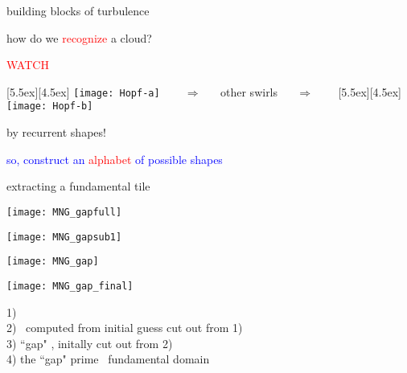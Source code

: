 \begin{frame}{building blocks of turbulence}

how do we \textcolor{red}{recognize} a cloud?

\bigskip
\begin{center}
\centerline{\textcolor{red}{\Huge WATCH}}

\begin{minipage}[t]{\textwidth}
	\begin{center}
\centerline{
\raisebox{-4.0ex}[5.5ex][4.5ex]
		 {\texttt{[image: Hopf-a]}}
~~~ $\Longrightarrow$ ~~ {other swirls} ~~ $\Longrightarrow$ ~~~
	\raisebox{-4.0ex}[5.5ex][4.5ex]
		 {\texttt{[image: Hopf-b]}}
          }
	\end{center}
\end{minipage}
\end{center}

\bigskip

{\Large by recurrent shapes!}

\vfill

\centerline{
\textcolor{blue}{so, construct an \textcolor{red}{\Large alphabet} of possible shapes}
}
\end{frame}

\begin{frame}{extracting a fundamental tile}
\begin{minipage}[height=.60\textheight]{.24\textheight}
\centering %
\texttt{[image: MNG\_gapfull]}
\end{minipage} \quad
\begin{minipage}[height=.60\textheight]{.24\textheight}
\centering %
\texttt{[image: MNG\_gapsub1]}
\end{minipage} \quad
\begin{minipage}[height=.60\textheight]{.18\textheight}
\centering             %
\texttt{[image: MNG\_gap]}
\end{minipage} \quad
\begin{minipage}[height=.60\textheight]{.12\textheight}
\centering %
\texttt{[image: MNG\_gap\_final]}
\end{minipage}

1) \twot\ %
    \\
2) \twot\ computed from initial guess cut out from 1)
    \\
3) ``gap" \twot, %
     initally cut out from 2)
     \\
4) the ``gap"  prime  \twot\ fundamental domain
\end{frame}

